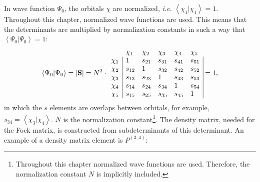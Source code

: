 In wave function $\Psi_0$, the orbitals $\chi$ are normalized, \textit{i.e.} $\left< \chi_1 | \chi_1 \right> = 1$. Throughout this chapter, normalized wave functions are used. This means that the determinants are multiplied by normalization constants in such a way that $\left< \Psi_0 |  \Psi_0 \right> = 1$:
\begin{equation}
\left < \Psi_0 | \Psi_0 \right> = | \mathbf{S} | = N^2 \cdot
\begin{array}{llllll}
 &  \chi_1 & \chi_2 & \chi_3 & \chi_4 & \chi_5 \\
 \chi_1 & \multicolumn{1}{|l}{ 1 } & s_{21} & s_{31} & s_{41} & \multicolumn{1}{l|}{ s_{51} } \\
 \chi_2 & \multicolumn{1}{|l}{ s_{12} } & 1 & s_{32} & s_{42} & \multicolumn{1}{l|}{ s_{52} } \\
 \chi_3 & \multicolumn{1}{|l}{ s_{13} } & s_{23} & 1 & s_{43} & \multicolumn{1}{l|}{ s_{53} } \\
 \chi_4 & \multicolumn{1}{|l}{ s_{14} } & s_{24} & s_{34} & 1 & \multicolumn{1}{l|}{ s_{54} } \\
 \chi_5 & \multicolumn{1}{|l}{ s_{15} } & s_{25} & s_{35} & s_{45} & \multicolumn{1}{l|}{ 1 }
\end{array} = 1,
\label{ch2.eq.s0g}
\end{equation}
in which the $s$ elements are overlaps between orbitals, for example, $s_{34} = \left< \chi_3 | \chi_4 \right>$. $N$ is the normalization constant\footnote{Throughout this chapter normalized wave functions are used. Therefore, the normalization constant $N$ is implicitly included.}. The density matrix, needed for the Fock matrix, is constructed from subdeterminants of this determinant. An example of a density matrix element is $P^{(3,4)}$:
